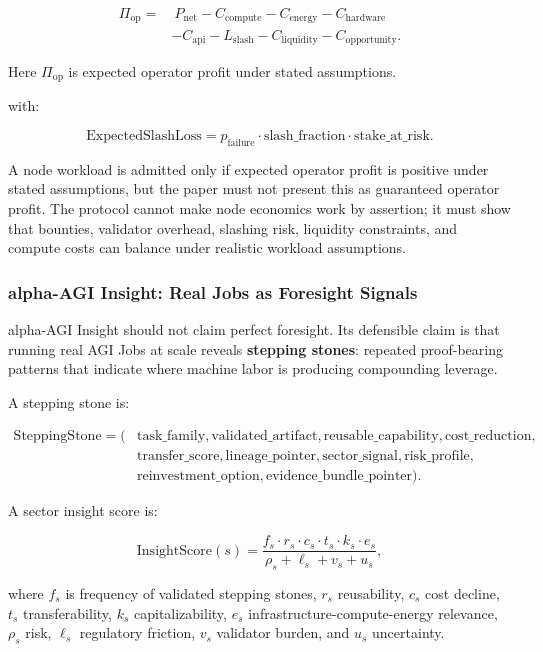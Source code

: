 \documentclass[
  11pt,
]{article}
\begin{document}
\[
\begin{aligned}
\Pi_{\mathrm{op}}=&\ P_{\mathrm{net}}
-C_{\mathrm{compute}}
-C_{\mathrm{energy}}
-C_{\mathrm{hardware}}\\
&-C_{\mathrm{api}}
-L_{\mathrm{slash}}
-C_{\mathrm{liquidity}}
-C_{\mathrm{opportunity}}.
\end{aligned}
\]

Here \(\Pi_{\mathrm{op}}\) is expected operator profit under stated
assumptions.

with:

\[
\mathrm{ExpectedSlashLoss}
=
p_{\mathrm{failure}}\cdot
\mathrm{slash\_fraction}\cdot
\mathrm{stake\_at\_risk}.
\]

A node workload is admitted only if expected operator profit is positive
under stated assumptions, but the paper must not present this as
guaranteed operator profit. The protocol cannot make node economics work
by assertion; it must show that bounties, validator overhead, slashing
risk, liquidity constraints, and compute costs can balance under
realistic workload assumptions.

\subsubsection{alpha-AGI Insight: Real Jobs as Foresight
Signals}\label{alpha-agi-insight-real-jobs-as-foresight-signals}

alpha-AGI Insight should not claim perfect foresight. Its defensible
claim is that running real AGI Jobs at scale reveals \textbf{stepping
stones}: repeated proof-bearing patterns that indicate where machine
labor is producing compounding leverage.

A stepping stone is:

\[
\begin{aligned}
\mathrm{SteppingStone}=(&\mathrm{task\_family}, \mathrm{validated\_artifact},
\mathrm{reusable\_capability}, \mathrm{cost\_reduction},\\
&\mathrm{transfer\_score}, \mathrm{lineage\_pointer},
\mathrm{sector\_signal}, \mathrm{risk\_profile},\\
&\mathrm{reinvestment\_option}, \mathrm{evidence\_bundle\_pointer}).
\end{aligned}
\]

A sector insight score is:

\[
\mathrm{InsightScore}(s)
=
\frac{
f_s\cdot r_s\cdot c_s\cdot t_s\cdot k_s\cdot e_s
}{
\rho_s+\ell_s+v_s+u_s
},
\]

where \(f_s\) is frequency of validated stepping stones, \(r_s\)
reusability, \(c_s\) cost decline, \(t_s\) transferability, \(k_s\)
capitalizability, \(e_s\) infrastructure-compute-energy relevance,
\(\rho_s\) risk, \(\ell_s\) regulatory friction, \(v_s\) validator
burden, and \(u_s\) uncertainty.
\end{document}
